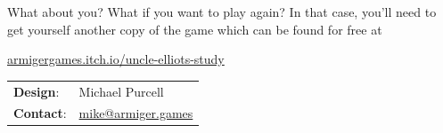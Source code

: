 \documentclass[a6paper, parskip=half, DIV=14, 12pt]{scrartcl}
\begin{document}
What about you? What if you want to play again? In that case, you'll need to get yourself another copy of the game which can be found for free at

\textcolor{Blue}{\href{https://armigergames.itch.io/uncle-elliots-study}{armigergames.itch.io/uncle-elliots-study}}

\hrulefill

\begin{tabular}{ll}
\textbf{Design}: & Michael Purcell \\
\textbf{Contact}: & \textcolor{Blue}{\href{mailto:mike@armiger.games}{mike@armiger.games}}
\end{tabular}

\newpage
\thispagestyle{empty}
\phantom{test}
\end{document}
